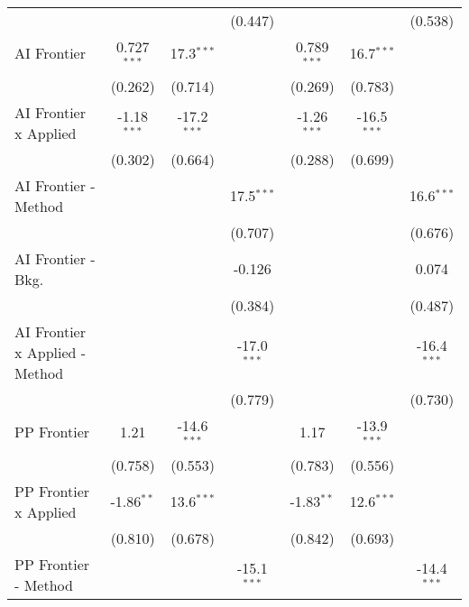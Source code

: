 \begin{tabular}{lcccccc}
                                  &               &               & (0.447)        &                &                & (0.538)\\   
   AI Frontier                    & 0.727$^{***}$ & 17.3$^{***}$  &                & 0.789$^{***}$  & 16.7$^{***}$   &   \\   
                                  & (0.262)       & (0.714)       &                & (0.269)        & (0.783)        &   \\   
   AI Frontier x Applied          & -1.18$^{***}$ & -17.2$^{***}$ &                & -1.26$^{***}$  & -16.5$^{***}$  &   \\   
                                  & (0.302)       & (0.664)       &                & (0.288)        & (0.699)        &   \\   
   AI Frontier - Method           &               &               & 17.5$^{***}$   &                &                & 16.6$^{***}$\\   
                                  &               &               & (0.707)        &                &                & (0.676)\\   
   AI Frontier - Bkg.             &               &               & -0.126         &                &                & 0.074\\   
                                  &               &               & (0.384)        &                &                & (0.487)\\   
   AI Frontier x Applied - Method &               &               & -17.0$^{***}$  &                &                & -16.4$^{***}$\\   
                                  &               &               & (0.779)        &                &                & (0.730)\\   
   PP Frontier                    & 1.21          & -14.6$^{***}$ &                & 1.17           & -13.9$^{***}$  &   \\   
                                  & (0.758)       & (0.553)       &                & (0.783)        & (0.556)        &   \\   
   PP Frontier x Applied          & -1.86$^{**}$  & 13.6$^{***}$  &                & -1.83$^{**}$   & 12.6$^{***}$   &   \\   
                                  & (0.810)       & (0.678)       &                & (0.842)        & (0.693)        &   \\   
   PP Frontier - Method           &               &               & -15.1$^{***}$  &                &                & -14.4$^{***}$\\   

\end{tabular}
